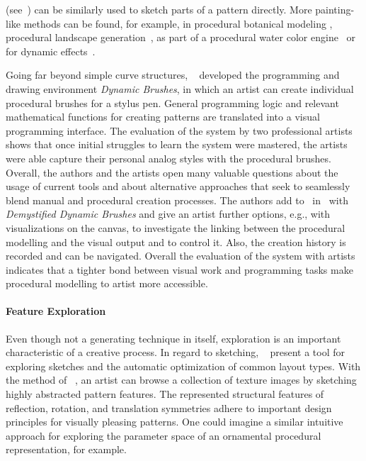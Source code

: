 \cite{gieseke_2017_ooo, kazi_2012_vit, xing_2014_apr, xing_2015_aha} (see~) can be similarly used to sketch parts of a pattern directly. More painting-like methods can be found, for example, in procedural botanical modeling \cite{anastacio_2008_spl,chen_2008_stm,palubicki_2009_sot}, procedural landscape generation~\cite{emilien_2015_wie}, as part of a procedural water color engine~\cite{diverdi_2013_ppp} or for dynamic effects~\cite{xing_2016_eit}. 


Going far beyond simple curve structures, \citeauthor*{jacobs_2018_dbe}~\cite{jacobs_2018_dbe} developed the programming and drawing environment \textit{Dynamic Brushes}, in which an artist can create individual procedural brushes for a stylus pen. General programming logic and relevant mathematical functions for creating patterns are translated into a visual programming interface. The evaluation of the system by two professional artists shows that once initial struggles to learn the system were mastered, the artists were able capture their personal analog styles with the procedural brushes. Overall, the authors and the artists open many valuable questions about the usage of current tools and about alternative approaches that seek to seamlessly blend manual and procedural creation processes. The authors add to~\cite{jacobs_2018_dbe} in~\cite{li_2020_sva} with \textit{Demystified Dynamic Brushes} and give an artist further options, e.g., with visualizations on the canvas, to investigate the linking between the procedural modelling and the visual output and to control it. Also, the creation history is recorded and can be navigated. Overall the evaluation of the system with artists indicates that a tighter bond between visual work and programming tasks make procedural modelling to artist more accessible.


\paragraph*{Feature Exploration}
\label{para:analysis_rulebased_exploration}

Even though not a generating technique in itself, exploration is an important characteristic of a creative process. In regard to sketching, \citeauthor*{todi_2016_sse}~\cite{todi_2016_sse} present a tool for exploring sketches and the automatic optimization of common layout types. With the method of \citeauthor*{chen_2016_msi}~\cite{chen_2016_msi}, an artist can browse a collection of texture images by sketching highly abstracted pattern features. The represented structural features of reflection, rotation, and translation symmetries adhere to important design principles for visually pleasing patterns. One could imagine a similar intuitive approach for exploring the parameter space of an ornamental procedural representation, for example.

